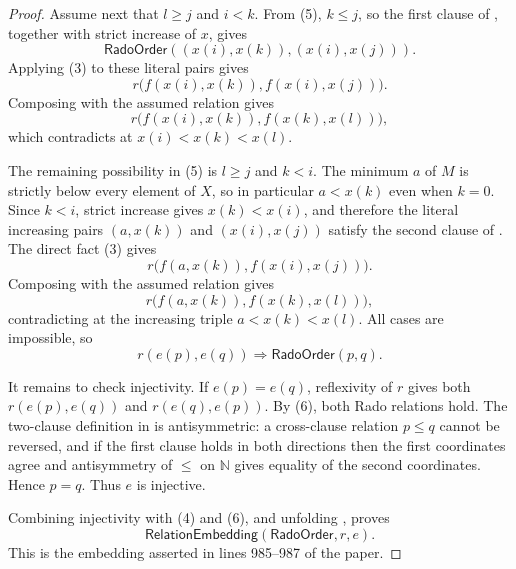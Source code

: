\begin{proof}
Assume next that $l\geq j$ and $i<k$.  From (5), $k\leq j$, so the
first clause of , together with strict increase of
$x$, gives
\[
\mathsf{RadoOrder}((x(i),x(k)),(x(i),x(j))).
\]
Applying (3) to these literal pairs gives
\[
r\bigl(f(x(i),x(k)),f(x(i),x(j))\bigr).
\]
Composing with the assumed relation gives
\[
r\bigl(f(x(i),x(k)),f(x(k),x(l))\bigr),
\]
which contradicts  at
$x(i)<x(k)<x(l)$.

The remaining possibility in (5) is $l\geq j$ and $k<i$.  The minimum
$a$ of $M$ is strictly below every element of $X$, so in particular
$a<x(k)$ even when $k=0$.  Since $k<i$, strict increase gives
$x(k)<x(i)$, and therefore the literal increasing pairs
$(a,x(k))$ and $(x(i),x(j))$ satisfy the second clause of
.  The direct fact (3) gives
\[
r\bigl(f(a,x(k)),f(x(i),x(j))\bigr).
\]
Composing with the assumed relation gives
\[
r\bigl(f(a,x(k)),f(x(k),x(l))\bigr),
\]
contradicting  at the increasing triple
$a<x(k)<x(l)$.  All cases are impossible, so
\[
r(e(p),e(q))\Longrightarrow\mathsf{RadoOrder}(p,q).
\tag{6}
\]

It remains to check injectivity.  If $e(p)=e(q)$, reflexivity of $r$
gives both $r(e(p),e(q))$ and $r(e(q),e(p))$.  By (6), both Rado
relations hold.  The two-clause definition in  is
antisymmetric: a cross-clause relation $p\leq q$ cannot be reversed,
and if the first clause holds in both directions then the first
coordinates agree and antisymmetry of $\leq$ on $\mathbb N$ gives equality
of the second coordinates.  Hence $p=q$.  Thus $e$ is injective.

Combining injectivity with (4) and (6), and unfolding
, proves
\[
\mathsf{RelationEmbedding}(\mathsf{RadoOrder},r,e).
\]
This is the embedding asserted in lines 985--987 of the paper.
\end{proof}
